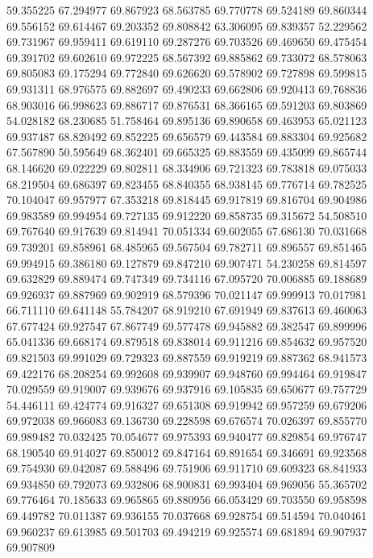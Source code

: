59.355225
67.294977
69.867923
68.563785
69.770778
69.524189
69.860344
69.556152
69.614467
69.203352
69.808842
63.306095
69.839357
52.229562
69.731967
69.959411
69.619110
69.287276
69.703526
69.469650
69.475454
69.391702
69.602610
69.972225
68.567392
69.885862
69.733072
68.578063
69.805083
69.175294
69.772840
69.626620
69.578902
69.727898
69.599815
69.931311
68.976575
69.882697
69.490233
69.662806
69.920413
69.768836
68.903016
66.998623
69.886717
69.876531
68.366165
69.591203
69.803869
54.028182
68.230685
51.758464
69.895136
69.890658
69.463953
65.021123
69.937487
68.820492
69.852225
69.656579
69.443584
69.883304
69.925682
67.567890
50.595649
68.362401
69.665325
69.883559
69.435099
69.865744
68.146620
69.022229
69.802811
68.334906
69.721323
69.783818
69.075033
68.219504
69.686397
69.823455
68.840355
68.938145
69.776714
69.782525
70.104047
69.957977
67.353218
69.818445
69.917819
69.816704
69.904986
69.983589
69.994954
69.727135
69.912220
69.858735
69.315672
54.508510
69.767640
69.917639
69.814941
70.051334
69.602055
67.686130
70.031668
69.739201
69.858961
68.485965
69.567504
69.782711
69.896557
69.851465
69.994915
69.386180
69.127879
69.847210
69.907471
54.230258
69.814597
69.632829
69.889474
69.747349
69.734116
67.095720
70.006885
69.188689
69.926937
69.887969
69.902919
68.579396
70.021147
69.999913
70.017981
66.711110
69.641148
55.784207
68.919210
67.691949
69.837613
69.460063
67.677424
69.927547
67.867749
69.577478
69.945882
69.382547
69.899996
65.041336
69.668174
69.879518
69.838014
69.911216
69.854632
69.957520
69.821503
69.991029
69.729323
69.887559
69.919219
69.887362
68.941573
69.422176
68.208254
69.992608
69.939907
69.948760
69.994464
69.919847
70.029559
69.919007
69.939676
69.937916
69.105835
69.650677
69.757729
54.446111
69.424774
69.916327
69.651308
69.919942
69.957259
69.679206
69.972038
69.966083
69.136730
69.228598
69.676574
70.026397
69.855770
69.989482
70.032425
70.054677
69.975393
69.940477
69.829854
69.976747
68.190540
69.914027
69.850012
69.847164
69.891654
69.346691
69.923568
69.754930
69.042087
69.588496
69.751906
69.911710
69.609323
68.841933
69.934850
69.792073
69.932806
68.900831
69.993404
69.969056
55.365702
69.776464
70.185633
69.965865
69.880956
66.053429
69.703550
69.958598
69.449782
70.011387
69.936155
70.037668
69.928754
69.514594
70.040461
69.960237
69.613985
69.501703
69.494219
69.925574
69.681894
69.907937
69.907809
